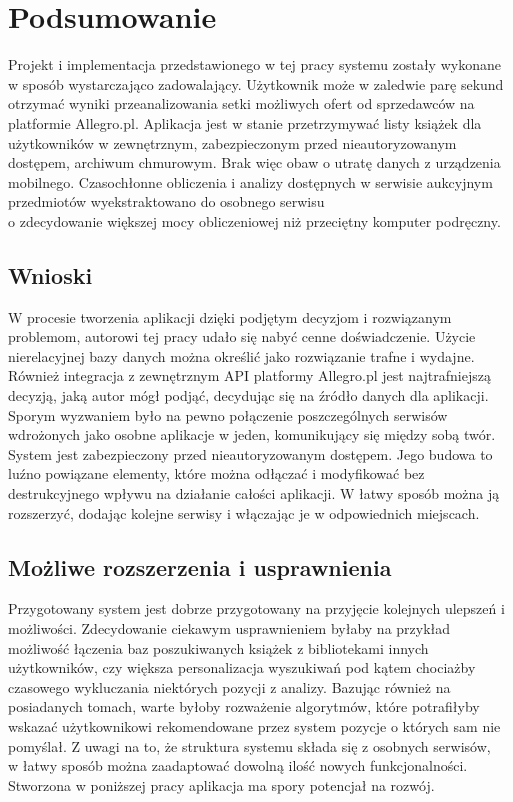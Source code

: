 \chapter{Podsumowanie}
\label{cha:podsumowanie}

Projekt i implementacja przedstawionego w tej pracy systemu zostały wykonane\\w sposób wystarczająco zadowalający. Użytkownik może w zaledwie parę sekund otrzymać wyniki przeanalizowania setki możliwych ofert od sprzedawców na platformie Allegro.pl. Aplikacja jest w stanie przetrzymywać listy książek dla użytkowników w zewnętrznym, zabezpieczonym przed nieautoryzowanym dostępem, archiwum chmurowym. Brak więc obaw o utratę danych z urządzenia mobilnego. Czasochłonne obliczenia i analizy dostępnych w serwisie aukcyjnym przedmiotów wyekstraktowano do osobnego serwisu\\o zdecydowanie większej mocy obliczeniowej niż przeciętny komputer podręczny.

\section{Wnioski}
W procesie tworzenia aplikacji dzięki podjętym decyzjom i rozwiązanym problemom, autorowi tej pracy udało się nabyć cenne doświadczenie. 
Użycie nierelacyjnej bazy danych można określić jako rozwiązanie trafne i wydajne. Również integracja z zewnętrznym API platformy Allegro.pl jest najtrafniejszą decyzją, jaką autor mógł podjąć, decydując się na źródło danych dla aplikacji.\newline
Sporym wyzwaniem było na pewno połączenie poszczególnych serwisów wdrożonych jako osobne aplikacje w jeden, komunikujący się między sobą twór.\newline
System jest zabezpieczony przed nieautoryzowanym dostępem. Jego budowa to luźno powiązane elementy, które można odłączać i modyfikować bez destrukcyjnego wpływu na działanie całości aplikacji.
W łatwy sposób można ją rozszerzyć, dodając kolejne serwisy i włączając je w odpowiednich miejscach.

\newpage
\section{Możliwe rozszerzenia i usprawnienia}
Przygotowany system jest dobrze przygotowany na przyjęcie kolejnych ulepszeń i możliwości.\newline
Zdecydowanie ciekawym usprawnieniem byłaby na przykład możliwość łączenia baz poszukiwanych książek z bibliotekami innych użytkowników, czy większa personalizacja wyszukiwań pod kątem chociażby czasowego wykluczania niektórych pozycji z analizy.\newline
Bazując również na posiadanych tomach, warte byłoby rozważenie algorytmów, które potrafiłyby wskazać użytkownikowi rekomendowane przez system pozycje o których sam nie pomyślał.
Z uwagi na to, że struktura systemu składa się z osobnych serwisów,\\w łatwy sposób można zaadaptować dowolną ilość nowych funkcjonalności.\newline
Stworzona w poniższej pracy aplikacja ma spory potencjał na rozwój.